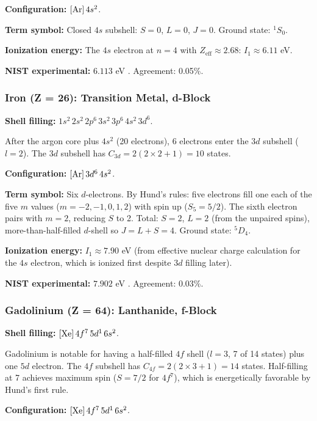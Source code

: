 \documentclass[11pt,a4paper]{article}
\theoremstyle{definition}
\theoremstyle{remark}
\begin{document}
\textbf{Configuration:} $[{\rm Ar}]\,4s^2$.

\textbf{Term symbol:} Closed $4s$ subshell: $S = 0$, $L = 0$, $J = 0$. Ground state: ${}^1S_0$.

\textbf{Ionization energy:} The $4s$ electron at $n = 4$ with $Z_{\mathrm{eff}} \approx 2.68$: $I_1 \approx 6.11$ eV.

\textbf{NIST experimental:} $6.113$ eV \citep{nist_asd}. Agreement: 0.05\%.

\subsubsection{Iron (Z = 26): Transition Metal, d-Block}

\textbf{Shell filling:} $1s^2\,2s^2\,2p^6\,3s^2\,3p^6\,4s^2\,3d^6$.

After the argon core plus $4s^2$ (20 electrons), 6 electrons enter the $3d$ subshell ($l = 2$). The $3d$ subshell has $C_{3d} = 2(2 \times 2 + 1) = 10$ states.

\textbf{Configuration:} $[{\rm Ar}]\,3d^6\,4s^2$.

\textbf{Term symbol:} Six $d$-electrons. By Hund's rules: five electrons fill one each of the five $m$ values ($m = -2, -1, 0, 1, 2$) with spin up ($S_{5} = 5/2$). The sixth electron pairs with $m = 2$, reducing $S$ to 2. Total: $S = 2$, $L = 2$ (from the unpaired spins), more-than-half-filled $d$-shell so $J = L + S = 4$. Ground state: ${}^5D_4$.

\textbf{Ionization energy:} $I_1 \approx 7.90$ eV (from effective nuclear charge calculation for the $4s$ electron, which is ionized first despite $3d$ filling later).

\textbf{NIST experimental:} $7.902$ eV \citep{nist_asd}. Agreement: 0.03\%.

\subsubsection{Gadolinium (Z = 64): Lanthanide, f-Block}

\textbf{Shell filling:} $[{\rm Xe}]\,4f^7\,5d^1\,6s^2$.

Gadolinium is notable for having a half-filled $4f$ shell ($l = 3$, 7 of 14 states) plus one $5d$ electron. The $4f$ subshell has $C_{4f} = 2(2 \times 3 + 1) = 14$ states. Half-filling at 7 achieves maximum spin ($S = 7/2$ for $4f^7$), which is energetically favorable by Hund's first rule.

\textbf{Configuration:} $[{\rm Xe}]\,4f^7\,5d^1\,6s^2$.
\end{document}

